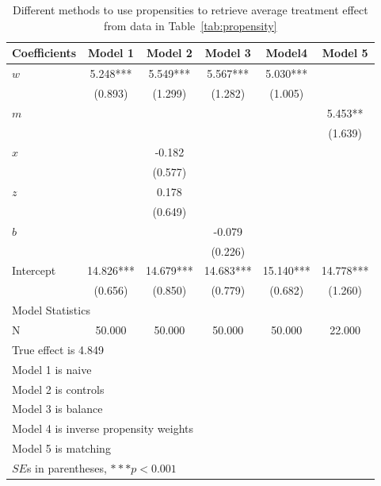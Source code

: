 \begin{table}[htbp]\centering
\caption{Different methods to use propensities to retrieve average treatment effect from data in Table~\ref{tab:propensity}
\label{tab:propensitymodels}}
\begin{tabular}{lccccc}
\hline
Coefficients&Model 1&Model 2&Model 3&Model4 & Model 5 \\
\hline
$w$      &    5.248***&    5.549***&    5.567***&    5.030***&        \\
      &   (0.893)  &   (1.299)  &   (1.282)  &   (1.005)  &        \\
$m$      &        &        &        &        &    5.453** \\
      &        &        &        &        &   (1.639)  \\
$x$      &        &   -0.182  &        &        &        \\
      &        &   (0.577)  &        &        &        \\
$z$      &        &    0.178  &        &        &        \\
      &        &   (0.649)  &        &        &        \\
$b$      &        &        &   -0.079  &        &        \\
      &        &        &   (0.226)  &        &        \\

Intercept    &   14.826***&   14.679***&   14.683***&   15.140***&   14.778***\\
      &   (0.656)  &   (0.850)  &   (0.779)  &   (0.682)  &   (1.260)  \\
\hline
\multicolumn{4}{l}{Model Statistics} \\
\hline
N 						 &   50.000  &   50.000  &   50.000  &   50.000  &   22.000  \\
\hline
\multicolumn{6}{l}{True effect is 4.849} \\
\multicolumn{6}{l}{Model 1 is naive} \\
\multicolumn{6}{l}{Model 2 is controls} \\
\multicolumn{6}{l}{Model 3 is balance} \\
\multicolumn{6}{l}{Model 4 is inverse propensity weights} \\
\multicolumn{6}{l}{Model 5 is matching} \\
\multicolumn{6}{l}{$SE$s in parentheses, $***p<0.001$} \\
\hline
\end{tabular}
\end{table}

